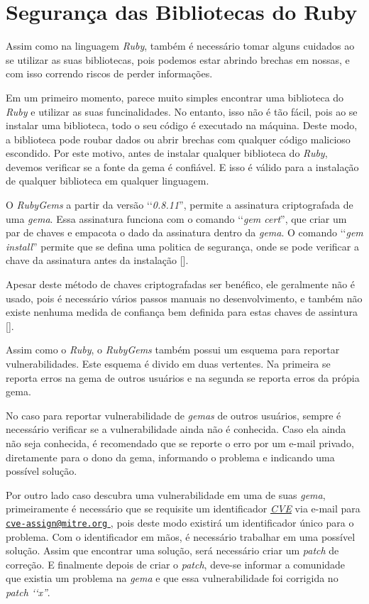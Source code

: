 \section{Segurança das Bibliotecas do Ruby}
\label{section:segurança_das_bibliotecas_do_ruby}

Assim como na linguagem \emph{Ruby}, também é necessário tomar alguns cuidados ao se utilizar as suas
bibliotecas, pois podemos estar abrindo brechas em nossas, e com isso correndo riscos de perder
informações.

Em um primeiro momento, parece muito simples encontrar uma biblioteca do \emph{Ruby} e utilizar as
suas funcinalidades. No entanto, isso não é tão fácil, pois ao se instalar uma biblioteca,
todo o seu código é executado na máquina. Deste modo, a biblioteca pode roubar dados ou abrir
brechas com qualquer código malicioso escondido. Por este motivo, antes de instalar qualquer
biblioteca do \emph{Ruby}, devemos verificar se a fonte da gema é confiável. E isso é válido para
a instalação de qualquer biblioteca em qualquer linguagem.

O \emph{RubyGems} a partir da versão ‘‘\emph{0.8.11}'', permite a assinatura criptografada de uma \emph{gema}.
Essa assinatura funciona com o comando ‘‘\emph{gem cert}'', que criar um par de chaves e empacota o dado da
assinatura dentro da \emph{gema}. O comando ‘‘\emph{gem install}'' permite que se defina uma politica de
segurança, onde se pode verificar a chave da assinatura antes da instalação [].

Apesar deste método de chaves criptografadas ser benéfico, ele geralmente não é usado, pois é necessário
vários passos manuais no desenvolvimento, e também não existe nenhuma medida de confiança bem definida
para estas chaves de assintura [].

Assim como o \emph{Ruby}, o \emph{RubyGems} também possui um esquema para reportar vulnerabilidades.
Este esquema é divido em duas vertentes. Na primeira se reporta erros na gema de outros usuários e na
segunda se reporta erros da própia gema.

No caso para reportar vulnerabilidade de \emph{gemas} de outros usuários, sempre é necessário verificar
se a vulnerabilidade ainda não é conhecida. Caso ela ainda não seja conhecida, é recomendado que se
reporte o erro por um e-mail privado, diretamente para o dono da gema, informando o problema e
indicando uma possível solução.

Por outro lado caso descubra uma vulnerabilidade em uma de suas \emph{gema}, primeiramente
é necessário que se requisite um identificador \emph{\href{https://cve.mitre.org/}{CVE}} via e-mail para
\href{mailto:cve-assign@mitre.org}{\nolinkurl{cve-assign@mitre.org} }, pois deste modo existirá
um identificador único para o problema. Com o identificador em mãos, é necessário trabalhar em uma
possível solução. Assim que encontrar uma solução, será necessário criar um \emph{patch} de correção.
E finalmente depois de criar o \emph{patch}, deve-se informar a comunidade que existia um problema na
\emph{gema} e que essa vulnerabilidade foi corrigida no \emph{patch ‘‘x''}.

